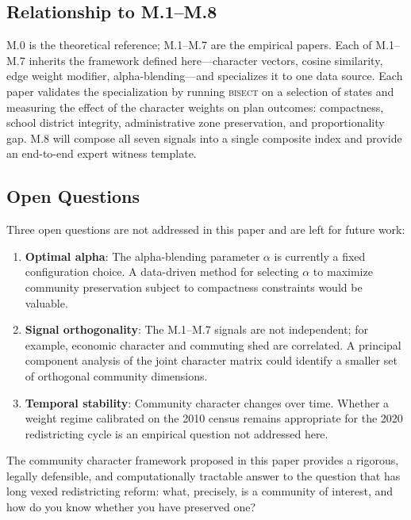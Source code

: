 \subsection{Relationship to M.1--M.8}

M.0 is the theoretical reference; M.1--M.7 are the empirical papers.
Each of M.1--M.7 inherits the framework defined here---character vectors, cosine
similarity, edge weight modifier, alpha-blending---and specializes it to one
data source.
Each paper validates the specialization by running \textsc{bisect} on a selection
of states and measuring the effect of the character weights on plan outcomes:
compactness, school district integrity, administrative zone preservation, and
proportionality gap.
M.8 will compose all seven signals into a single composite index and provide
an end-to-end expert witness template.

\subsection{Open Questions}

Three open questions are not addressed in this paper and are left for future work:
\begin{enumerate}
  \item \textbf{Optimal alpha}: The alpha-blending parameter $\alpha$ is currently
    a fixed configuration choice.
    A data-driven method for selecting $\alpha$ to maximize community preservation
    subject to compactness constraints would be valuable.
  \item \textbf{Signal orthogonality}: The M.1--M.7 signals are not independent;
    for example, economic character and commuting shed are correlated.
    A principal component analysis of the joint character matrix could identify
    a smaller set of orthogonal community dimensions.
  \item \textbf{Temporal stability}: Community character changes over time.
    Whether a weight regime calibrated on the 2010 census remains appropriate for
    the 2020 redistricting cycle is an empirical question not addressed here.
\end{enumerate}

The community character framework proposed in this paper provides a rigorous,
legally defensible, and computationally tractable answer to the question that
has long vexed redistricting reform: what, precisely, is a community of interest,
and how do you know whether you have preserved one?
